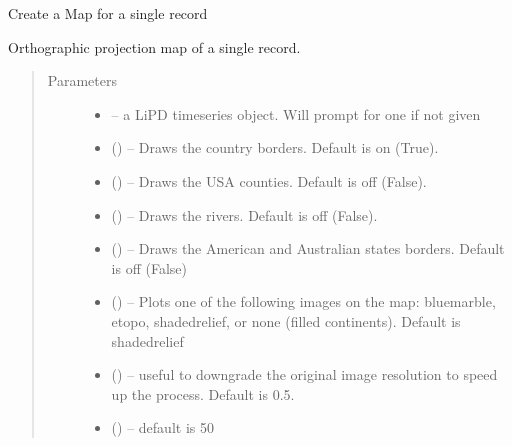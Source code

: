 \documentclass[letterpaper,10pt,english]{sphinxmanual}
\begin{document}

\begin{fulllineitems}
\label{\detokenize{Main:pyleoclim.mapLipd}}
Create a Map for a single record

Orthographic projection map of a single record.
\begin{quote}\begin{description}
\item[{Parameters}] \leavevmode\begin{itemize}
\item {} 
 -- a LiPD timeseries object. Will prompt for one if not given

\item {} 
 () -- Draws the country borders. Default is on (True).

\item {} 
 () -- Draws the USA counties. Default is off (False).

\item {} 
 () -- Draws the rivers. Default is off (False).

\item {} 
 () -- Draws the American and Australian states borders.
Default is off (False)

\item {} 
 () -- Plots one of the following images on the map:
bluemarble, etopo, shadedrelief, or none (filled continents).
Default is shadedrelief

\item {} 
 () -- useful to downgrade the original image resolution to
speed up the process. Default is 0.5.

\item {} 
 () -- default is 50


\end{itemize}
\end{description}
\end{quote}
\end{fulllineitems}
\end{document}
